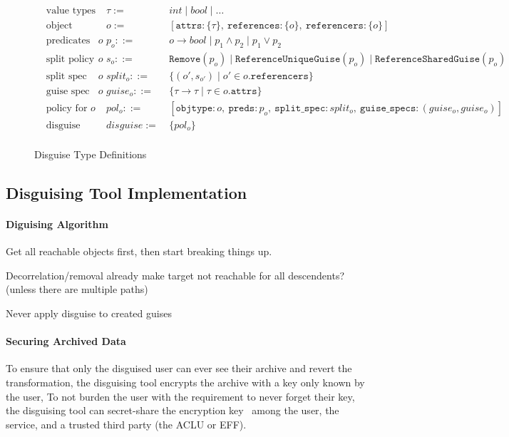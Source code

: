 \begin{figure*}
\begin{align*}
    &\text{value types} &\tau:=  &~ int \mid bool \mid \dots \\
    &\text{object types }&o :=  &~ [\mathtt{attrs}: \{\tau\},~\mathtt{references}:
    \{o\},~\mathtt{referencers}: \{o\}]\\
    &\text{predicates of $o$} &p_o ::= &~ o \to bool \mid p_1 \wedge p_2 \mid p_1 \vee p_2\\
    &\text{split policy for $o$} &s_o ::= &~ 
        \mathtt{Remove}(p_o) 
        \mid \mathtt{ReferenceUniqueGuise}(p_o)
        \mid \mathtt{ReferenceSharedGuise}(p_o)\\
    &\text{split spec for $o$} & split_o ::= &~ \{(o', s_{o'}) \mid o' \in o.\mathtt{referencers}\}\\
    &\text{guise spec for $o$} &guise_o ::= &~ \{\tau \to \tau \mid \tau \in o.\mathtt{attrs}\} \\
    &\text{policy for $o$} &pol_o ::=  &~ 
        [\mathtt{objtype}: o,~
        \mathtt{preds}: p_o,~
        \mathtt{split\_spec}: split_o,~
        \mathtt{guise\_specs}: (guise_o, guise_o)]\\
    &\text{disguise} &disguise :=  &~ \{pol_o\}\\
\end{align*}
    \caption{Disguise Type Definitions}
    \label{fig:types}
\end{figure*}

\subsection{Disguising Tool Implementation}

\paragraph{Diguising Algorithm}
Get all reachable objects first, then start breaking things up.

Decorrelation/removal already make target not reachable for all descendents? (unless there are
multiple paths)

Never apply disguise to created guises


\paragraph{Securing Archived Data}
To ensure that only the disguised user can ever see their archive and revert the transformation, the disguising tool
encrypts the archive with a key only known by the user, To not burden the user with the requirement to never
forget their key, the disguising tool can secret-share the encryption key~\cite{secretsharing} among the
user, the service, and a trusted third party (\eg the ACLU or EFF).

